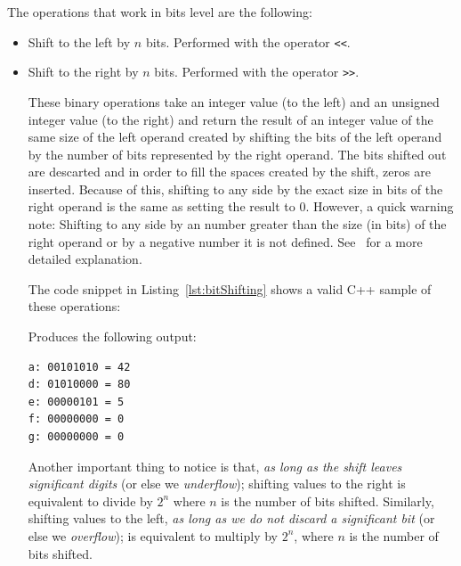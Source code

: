 The operations that work in bits level are the following:
\begin{itemize}
\item Shift to the left by $n$ bits. Performed with the operator \texttt{<<}.
\item Shift to the right by $n$ bits. Performed with the operator \texttt{>>}.

These binary operations take an integer value (to the left) and an unsigned integer value (to the right) and return the result of an integer value of the same size of the left operand created by shifting the bits of the left operand by the number of bits represented by the right operand.
The bits shifted out are descarted and in order to fill the spaces created by the shift, zeros are inserted.
Because of this, shifting to any side by the exact size in bits of the right operand is the same as setting the result to 0.
However, a quick warning note: Shifting to any side by an number greater than the size (in bits) of the right operand or by a negative number it is not defined. See~\cite{INT34Cpp} for a more detailed explanation.

The code snippet in Listing~\ref{lst:bitShifting} shows a valid C++ sample of these operations:

{\centering
\begin{minipage}{\linewidth}
\end{minipage}
\par
}

Produces the following output:

\begin{verbatim}
a: 00101010 = 42
d: 01010000 = 80
e: 00000101 = 5
f: 00000000 = 0
g: 00000000 = 0
\end{verbatim} 

Another important thing to notice is that, \emph{as long as the shift leaves significant digits} (or else we \emph{underflow}); shifting values to the right is equivalent to divide by $2^n$ where $n$ is the number of bits shifted.
Similarly, shifting values to the left, \emph{as long as we do not discard a significant bit} (or else we \emph{overflow}); is equivalent to multiply by $2^n$, where $n$ is the number of bits shifted.


\end{itemize}
